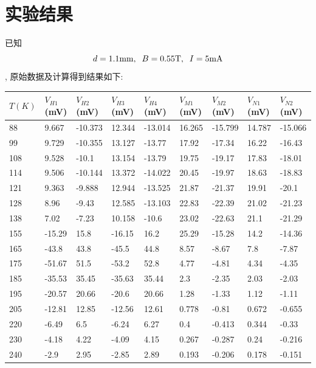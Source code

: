 \documentclass[UTF8]{ctexart}
\begin{document}
\section{实验结果}
已知$$
d=1.1{\rm mm},\;\;B=0.55{\rm T},\;\;I= 5{\rm mA}$$,
原始数据及计算得到结果如下:\\
\begin{table}[!ht]
    \centering
    \begin{tabular}{|l|l|l|l|l|l|l|l|l|}
    \hline
        $T(K)$ &$V_{H1}$(mV) & $V_{H2}$(mV) &$V_{H3}$(mV) & $V_{H4}$(mV) & $V_{M1}$(mV) & $V_{M2}$(mV) & $V_{N1}$(mV) & $V_{N2}$(mV) \\ \hline
        88 & 9.667 & -10.373 & 12.344 & -13.014 & 16.265 & -15.799 & 14.787 & -15.066 \\ \hline
        99 & 9.729 & -10.355 & 13.127 & -13.77 & 17.92 & -17.34 & 16.22 & -16.43 \\ \hline
        108 & 9.528 & -10.1 & 13.154 & -13.79 & 19.75 & -19.17 & 17.83 & -18.01 \\ \hline
        114 & 9.506 & -10.144 & 13.372 & -14.022 & 20.45 & -19.97 & 18.63 & -18.83 \\ \hline
        121 & 9.363 & -9.888 & 12.944 & -13.525 & 21.87 & -21.37 & 19.91 & -20.1 \\ \hline
        128 & 8.96 & -9.43 & 12.585 & -13.103 & 22.83 & -22.39 & 21.02 & -21.23 \\ \hline
        138 & 7.02 & -7.23 & 10.158 & -10.6 & 23.02 & -22.63 & 21.1 & -21.29 \\ \hline
        155 & -15.29 & 15.8 & -16.15 & 16.2 & 25.29 & -15.28 & 14.2 & -14.36 \\ \hline
        165 & -43.8 & 43.8 & -45.5 & 44.8 & 8.57 & -8.67 & 7.8 & -7.87 \\ \hline
        175 & -51.67 & 51.5 & -53.2 & 52.8 & 4.77 & -4.81 & 4.34 & -4.35 \\ \hline
        185 & -35.53 & 35.45 & -35.63 & 35.44 & 2.3 & -2.35 & 2.03 & -2.03 \\ \hline
        195 & -20.57 & 20.66 & -20.6 & 20.66 & 1.28 & -1.33 & 1.12 & -1.11 \\ \hline
        205 & -12.81 & 12.85 & -12.56 & 12.61 & 0.778 & -0.81 & 0.672 & -0.655 \\ \hline
        220 & -6.49 & 6.5 & -6.24 & 6.27 & 0.4 & -0.413 & 0.344 & -0.33 \\ \hline
        230 & -4.18 & 4.22 & -4.09 & 4.15 & 0.267 & -0.287 & 0.24 & -0.216 \\ \hline
        240 & -2.9 & 2.95 & -2.85 & 2.89 & 0.193 & -0.206 & 0.178 & -0.151 \\ \hline

\end{tabular}
\end{table}
\end{document}
